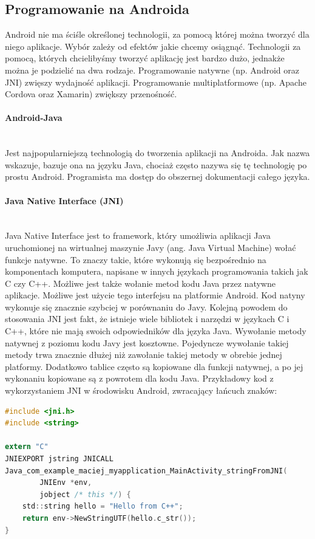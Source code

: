 \subsection{Programowanie na Androida}
Android nie ma ściśle określonej technologii, za pomocą której można tworzyć dla niego aplikacje. Wybór zależy od efektów jakie chcemy osiągnąć. Technologii za pomocą, których chcielibyśmy tworzyć aplikację jest bardzo dużo, jednakże można je podzielić na dwa rodzaje. Programowanie natywne (np. Android oraz JNI) zwięszy wydajność aplikacji. Programowanie multiplatformowe (np. Apache Cordova oraz Xamarin) zwiększy przenośność. 
\paragraph{Android-Java}\mbox{}\\
Jest najpopularniejszą technologią do tworzenia aplikacji na Androida. Jak nazwa wskazuje, bazuje ona na języku Java, chociaż często nazywa się tę technologię po prostu Android. Programista ma dostęp do obszernej dokumentacji całego języka.
\paragraph{Java Native Interface (JNI)}\mbox{}\\
Java Native Interface jest to framework, który umożliwia aplikacji Java uruchomionej na wirtualnej maszynie Javy (ang. Java Virtual Machine) wołać funkcje natywne. To znaczy takie, które wykonują się bezpośrednio na komponentach komputera, napisane w innych językach programowania takich jak C czy C++. Możliwe jest także wołanie metod kodu Java przez natywne aplikacje. Możliwe jest użycie tego interfejsu na platformie Android. Kod natyny wykonuje się znacznie szybciej w porównaniu do Javy. Kolejną powodem do stosowania JNI jest fakt, że istnieje wiele bibliotek i narzędzi w językach C i C++, które nie mają swoich odpowiedników dla języka Java. Wywołanie metody natywnej z poziomu kodu Javy jest kosztowne. Pojedyncze wywołanie takiej metody trwa znacznie dłużej niż zawołanie takiej metody w obrebie jednej platformy. Dodatkowo tablice często są kopiowane dla funkcji natywnej, a po jej wykonaniu kopiowane są z powrotem dla kodu Java. Przykładowy kod z wykorzystaniem JNI w środowisku Android, zwracający łańcuch znaków: 
\begin{lstlisting}[language=C]
#include <jni.h>
#include <string>

extern "C"
JNIEXPORT jstring JNICALL
Java_com_example_maciej_myapplication_MainActivity_stringFromJNI(
        JNIEnv *env,
        jobject /* this */) {
    std::string hello = "Hello from C++";
    return env->NewStringUTF(hello.c_str());
}
\end{lstlisting}

